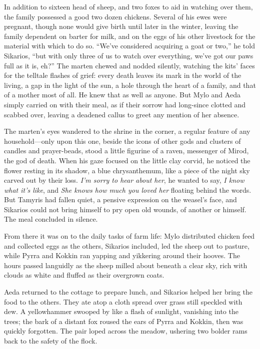 In addition to sixteen head of sheep, and two foxes to aid in watching over them, the family possessed a good two dozen chickens. Several of his ewes were pregnant, though none would give birth until later in the winter, leaving the family dependent on barter for milk, and on the eggs of his other livestock for the material with which to do so. ``We've considered acquiring a goat or two,'' he told Sikarios, ``but with only three of us to watch over everything, we've got our paws full as it is, eh?'' The marten chewed and nodded silently, watching the kits' faces for the telltale flashes of grief: every death leaves its mark in the world of the living, a gap in the light of the sun, a hole through the heart of a family, and that of a mother most of all. He knew that as well as anyone. But Mylo and Aeda simply carried on with their meal, as if their sorrow had long-since clotted and scabbed over, leaving a deadened callus to greet any mention of her absence.

The marten's eyes wandered to the shrine in the corner, a regular feature of any household---only upon this one, beside the icons of other gods and clusters of candles and prayer-beads, stood a little figurine of a raven, messenger of Mirod, the god of death. When his gaze focused on the little clay corvid, he noticed the flower resting in its shadow, a blue chrysanthemum, like a piece of the night sky carved out by their loss. \emph{I'm sorry to hear about her}, he wanted to say, \emph{I know what it's like}, and \emph{She knows how much you loved her} floating behind the words. But Tamyris had fallen quiet, a pensive expression on the weasel's face, and Sikarios could not bring himself to pry open old wounds, of another or himself. The meal concluded in silence.

From there it was on to the daily tasks of farm life: Mylo distributed chicken feed and collected eggs as the others, Sikarios included, led the sheep out to pasture, while Pyrra and Kokkin ran yapping and yikkering around their hooves. The hours passed languidly as the sheep milled about beneath a clear sky, rich with clouds as white and fluffed as their overgrown coats.

Aeda returned to the cottage to prepare lunch, and Sikarios helped her bring the food to the others. They ate atop a cloth spread over grass still speckled with dew. A yellowhammer swooped by like a flash of sunlight, vanishing into the trees; the bark of a distant fox roused the ears of Pyrra and Kokkin, then was quickly forgotten. The pair loped across the meadow, ushering two bolder rams back to the safety of the flock.

